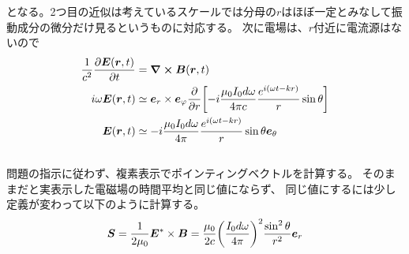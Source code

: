 \documentclass[../../sp_2017.tex]{subfiles}
\begin{document}
となる。2つ目の近似は考えているスケールでは分母の\(r\)はほぼ一定とみなして振動成分の微分だけ見るというものに対応する。
次に電場は、\(r\)付近に電流源はないので
\begin{equation}\begin{aligned}[b]
    \frac{1}{c^2}\pdv{\vb*{E}(\vb*{r},t)}{t}
    &=\curl \vb*{B}(\vb*{r},t)\\
    i\omega\vb*{E}(\vb*{r},t)
    &\simeq \vb*{e}_r\times\vb*{e}_\varphi \pdv{r}\qty[-i\frac{\mu_0I_0 d\omega}{4\pi c}\frac{e^{i(\omega t-kr)}}{r}\sin\theta]\\
    \vb*{E}(\vb*{r},t)
    &\simeq -i\frac{\mu_0I_0 d\omega}{4\pi}\frac{e^{i(\omega t-kr)}}{r}\sin\theta \vb*{e}_\theta
\end{aligned}\end{equation}


\subsection{}
問題の指示に従わず、複素表示でポインティングベクトルを計算する。
そのままだと実表示した電磁場の時間平均と同じ値にならず、
同じ値にするには少し定義が変わって以下のように計算する。
\begin{equation}\begin{aligned}[b]
    \vb*{S} = \frac{1}{2\mu_0}\vb*{E}^{*}\times \vb*{B}
    = \frac{\mu_0}{2c}\qty(\frac{I_0 d\omega}{4\pi})^2\frac{\sin^2\theta}{r^2} \vb*{e}_r
\end{aligned}\end{equation}
\end{document}
